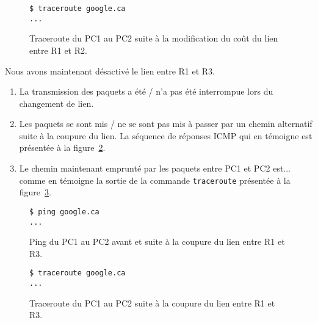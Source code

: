 \documentclass[]{article}
\begin{document}
\begin{figure}
      \centering
      \begin{lstlisting}
$ traceroute google.ca
...
      \end{lstlisting}
      \caption[]{Traceroute du PC1 au PC2 suite à la modification du coût du lien entre R1 et R2.}
      \label{fig:traceroute-pc1-pc2}
\end{figure}

Nous avons maintenant désactivé le lien entre R1 et R3.

\begin{enumerate}
      \item La transmission des paquets a été / n'a pas été interrompue lors du changement de lien.
      \item Les paquets se sont mis / ne se sont pas mis à passer par un chemin alternatif suite à la
            coupure du lien. La séquence de réponses ICMP qui en témoigne est présentée à la figure~\ref{fig:ping-pc1-pc2-coupure}.
      \item Le chemin maintenant emprunté par les paquets entre PC1 et PC2 est... comme en témoigne la sortie
            de la commande \texttt{traceroute} présentée à la figure~\ref{fig:traceroute-pc1-pc2-coupure}.
\end{enumerate}

\begin{figure}
      \centering
      \begin{lstlisting}
$ ping google.ca
...
      \end{lstlisting}
      \caption[]{Ping du PC1 au PC2 avant et suite à la coupure du lien entre R1 et R3.}
      \label{fig:ping-pc1-pc2-coupure}
\end{figure}

\begin{figure}
      \centering
      \begin{lstlisting}
$ traceroute google.ca
...
      \end{lstlisting}
      \caption[]{Traceroute du PC1 au PC2 suite à la coupure du lien entre R1 et R3.}
      \label{fig:traceroute-pc1-pc2-coupure}
\end{figure}

    
\end{document}

